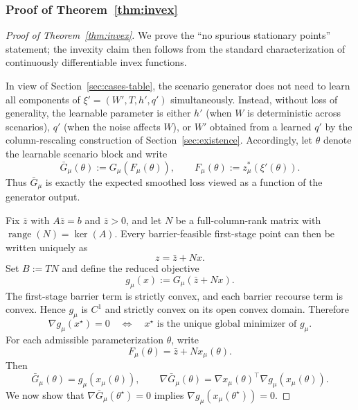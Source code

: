 \documentclass{article}
\theoremstyle{plain}
\theoremstyle{definition}
\theoremstyle{remark}
\begin{document}
\subsubsection{Proof of Theorem~\ref{thm:invex}}
\begin{proof}[Proof of Theorem~\ref{thm:invex}]
We prove the ``no spurious stationary points'' statement; the invexity claim then follows from the standard characterization of continuously differentiable invex functions.

In view of Section~\ref{sec:cases-table}, the scenario generator does not need to learn all components of
\(\xi'=(W',T,h',q')\) simultaneously. Instead, without loss of generality, the learnable parameter is
either \(h'\) (when \(W\) is deterministic across scenarios), \(q'\) (when the noise affects \(W\)), or \(W'\) obtained from a learned \(q'\) by the column-rescaling construction of Section~\ref{sec:existence}. Accordingly, let \(\theta\) denote the learnable scenario block and write
\[
\bar G_\mu(\theta):=G_\mu(F_\mu(\theta)),
\qquad
F_\mu(\theta):=z_\mu^*(\xi'(\theta)).
\]
Thus \(\bar G_\mu\) is exactly the expected smoothed loss viewed as a function of the generator output.

Fix \(\bar z\) with \(A\bar z=b\) and \(\bar z>0\), and let \(N\) be a full-column-rank matrix with \(\operatorname{range}(N)=\ker(A)\). Every barrier-feasible first-stage point can then be written uniquely as
\[
z=\bar z+Nx.
\]
Set \(B:=TN\) and define the reduced objective
\[
g_\mu(x):=G_\mu(\bar z+Nx).
\]
The first-stage barrier term is strictly convex, and each barrier recourse term is convex. Hence \(g_\mu\) is \(C^1\) and strictly convex on its open convex domain. Therefore
\[
\nabla g_\mu(x^\star)=0
\quad\Longleftrightarrow\quad
x^\star \text{ is the unique global minimizer of } g_\mu.
\]
For each admissible parameterization \(\theta\), write
\[
F_\mu(\theta)=\bar z+N x_\mu(\theta).
\]
Then
\[
\bar G_\mu(\theta)=g_\mu(x_\mu(\theta)),
\qquad
\nabla \bar G_\mu(\theta)=\nabla x_\mu(\theta)^\top \nabla g_\mu(x_\mu(\theta)).
\]
We now show that \(\nabla \bar G_\mu(\theta^\star)=0\) implies \(\nabla g_\mu(x_\mu(\theta^\star))=0\).


\end{proof}
\end{document}

